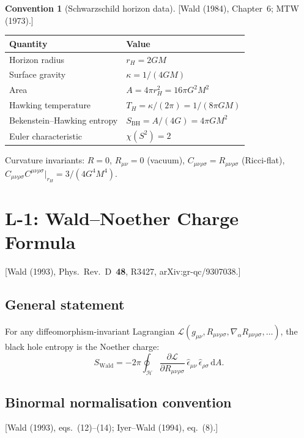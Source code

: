 \documentclass[12pt,a4paper]{article}
\theoremstyle{definition}
\newtheorem{convention}[proposition]{Convention}
\theoremstyle{remark}
\newcommand{\Weylsq}{C_{\mu\nu\rho\sigma}C^{\mu\nu\rho\sigma}}
\newcommand{\dd}{\mathrm{d}}
\newcommand{\fromlit}[1]{\textcolor{blue!70!black}{\textsf{[#1]}}}
\begin{document}
\begin{convention}[Schwarzschild horizon data]\label{conv:schw}
\fromlit{Wald (1984), Chapter~6; MTW (1973).}
\begin{center}
\begin{tabular}{ll}
\toprule
Quantity & Value \\
\midrule
Horizon radius & $r_H = 2GM$ \\
Surface gravity & $\kappa = 1/(4GM)$ \\
Area & $A = 4\pi r_H^2 = 16\pi G^2 M^2$ \\
Hawking temperature & $T_H = \kappa/(2\pi) = 1/(8\pi GM)$ \\
Bekenstein--Hawking entropy & $S_{\mathrm{BH}} = A/(4G) = 4\pi G M^2$ \\
Euler characteristic & $\chi(S^2) = 2$ \\
\bottomrule
\end{tabular}
\end{center}
Curvature invariants: $R = 0$, $R_{\mu\nu} = 0$ (vacuum),
$C_{\mu\nu\rho\sigma} = R_{\mu\nu\rho\sigma}$ (Ricci-flat),
$\Weylsq\big|_{r_H} = 3/(4G^4 M^4)$.
\end{convention}


\section{L-1: Wald--Noether Charge Formula}
\label{sec:L1}

\fromlit{Wald (1993), Phys.\ Rev.\ D~\textbf{48}, R3427,
arXiv:gr-qc/9307038.}

\subsection{General statement}

For any diffeomorphism-invariant Lagrangian
$\mathcal{L}(g_{\mu\nu}, R_{\mu\nu\rho\sigma},
\nabla_\alpha R_{\mu\nu\rho\sigma}, \ldots)$,
the black hole entropy is the Noether charge:
\begin{equation}\label{eq:wald-general}
  \boxed{
  S_{\mathrm{Wald}} = -2\pi \oint_{\mathcal{H}}
  \frac{\partial\mathcal{L}}{\partial R_{\mu\nu\rho\sigma}}\,
  \hat{\epsilon}_{\mu\nu}\,\hat{\epsilon}_{\rho\sigma}\,\dd A.}
\end{equation}

\subsection{Binormal normalisation convention}
\fromlit{Wald (1993), eqs.~(12)--(14); Iyer--Wald (1994), eq.~(8).}
\end{document}
